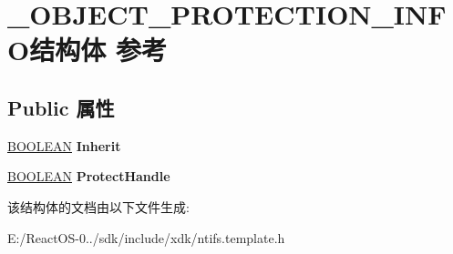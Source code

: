 \hypertarget{struct___o_b_j_e_c_t___p_r_o_t_e_c_t_i_o_n___i_n_f_o}{}\section{\+\_\+\+O\+B\+J\+E\+C\+T\+\_\+\+P\+R\+O\+T\+E\+C\+T\+I\+O\+N\+\_\+\+I\+N\+F\+O结构体 参考}
\label{struct___o_b_j_e_c_t___p_r_o_t_e_c_t_i_o_n___i_n_f_o}
\subsection*{Public 属性}
\begin{DoxyCompactItemize}
\item 
\mbox{\label{struct___o_b_j_e_c_t___p_r_o_t_e_c_t_i_o_n___i_n_f_o_a99bdbeb4a01d912ad0f75ecdc6f9cb68}} 
\hyperlink{_processor_bind_8h_a112e3146cb38b6ee95e64d85842e380a}{B\+O\+O\+L\+E\+AN} {\bfseries Inherit}
\item 
\mbox{\label{struct___o_b_j_e_c_t___p_r_o_t_e_c_t_i_o_n___i_n_f_o_ad7dba28e065296ca202f2eb18b339b84}} 
\hyperlink{_processor_bind_8h_a112e3146cb38b6ee95e64d85842e380a}{B\+O\+O\+L\+E\+AN} {\bfseries Protect\+Handle}
\end{DoxyCompactItemize}


该结构体的文档由以下文件生成\+:\begin{DoxyCompactItemize}
\item 
E\+:/\+React\+O\+S-\/0../sdk/include/xdk/ntifs.\+template.\+h\end{DoxyCompactItemize}
